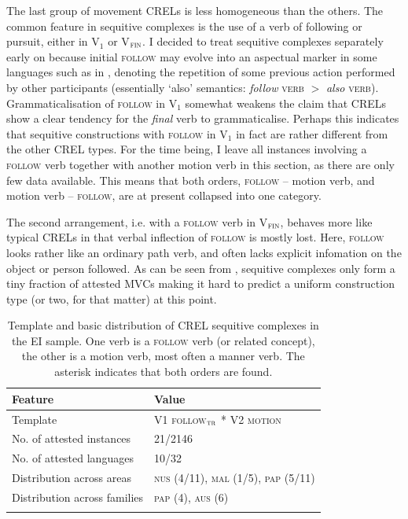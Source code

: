 The last group of movement CRELs is less homogeneous than the others. The common feature in sequitive complexes is the use of a verb of following or pursuit, either in V$_{1}$ or V$_{\textsc{fin}}$. I decided to treat sequitive complexes separately early on because initial \textsc{follow} may evolve into an aspectual marker in some languages such as in , denoting the repetition of some previous action performed by other participants (essentially `also' semantics: \textit{follow} \textsc{verb} $>$ \textit{also} \textsc{verb}). Grammaticalisation of \textsc{follow} in V$_{1}$ somewhat weakens the claim that CRELs show a clear tendency for the \emph{final} verb to grammaticalise. Perhaps this indicates that sequitive constructions with \textsc{follow} in V$_{1}$ in fact are rather different from the other CREL types. For the time being, I leave all instances involving a \textsc{follow} verb together with another motion verb in this section, as there are only few data available. This means that both orders, \textsc{follow} -- motion verb, and motion verb -- \textsc{follow}, are at present collapsed into one category.

The second arrangement, i.e. with a \textsc{follow} verb in V$_{\textsc{fin}}$, behaves more like typical CRELs in that verbal inflection of \textsc{follow} is mostly lost. Here, \textsc{follow} looks rather like an ordinary path verb, and often lacks explicit infomation on the object or person followed. As can be seen from , sequitive complexes only form a tiny fraction of attested MVCs making it hard to predict a uniform construction type (or two, for that matter) at this point.

\begin{table}
\begin{tabular}{ll}
\lsptoprule
Feature&Value\tabularnewline
\midrule
Template&V1 \textsc{follow$_{\textsc{tr}}$} * V2 \textsc{motion}\tabularnewline
No. of attested instances& 21/2146 \tabularnewline
No. of attested languages& 10/32 \tabularnewline
Distribution across areas& \textsc{nus} (4/11), \textsc{mal} (1/5), \textsc{pap} (5/11) \tabularnewline
Distribution across families& \textsc{pap} (4), \textsc{aus} (6) \tabularnewline
\lspbottomrule
\end{tabular}
\caption[Template and basic distribution of CREL sequitive complexes]{Template and basic distribution of CREL sequitive complexes in the EI sample. One verb is a \textsc{follow} verb (or related concept), the other is a motion verb, most often a manner verb. The asterisk indicates that both orders are found.}
\label{table:basiccrelseq}
\end{table}

